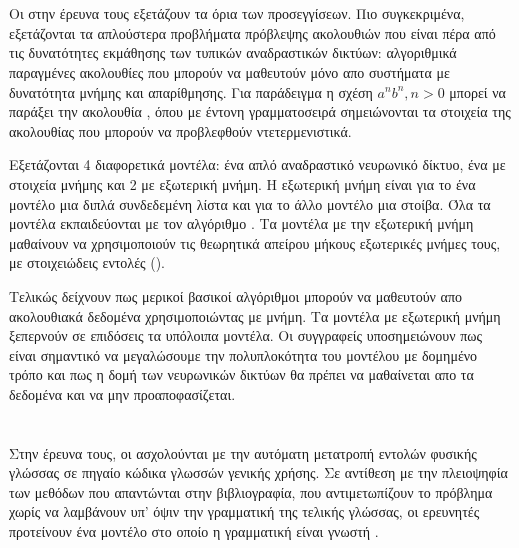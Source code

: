 \section{}

Οι  στην έρευνα τους εξετάζουν τα όρια των  προσεγγίσεων.
Πιο συγκεκριμένα, εξετάζονται τα απλούστερα προβλήματα πρόβλεψης ακολουθιών που είναι πέρα από τις δυνατότητες εκμάθησης των τυπικών αναδραστικών δικτύων: αλγοριθμικά παραγμένες ακολουθίες που μπορούν να μαθευτούν μόνο απο συστήματα με δυνατότητα μνήμης και απαρίθμησης.
Για παράδειγμα η σχέση $a^nb^n, n > 0$ μπορεί να παράξει την ακολουθία , όπου με έντονη γραμματοσειρά σημειώνονται τα στοιχεία της ακολουθίας που μπορούν να προβλεφθούν ντετερμενιστικά.

Εξετάζονται 4 διαφορετικά μοντέλα: ένα απλό αναδραστικό νευρωνικό δίκτυο, ένα  με στοιχεία μνήμης  και 2  με εξωτερική μνήμη.
Η εξωτερική μνήμη είναι για το ένα μοντέλο μια διπλά συνδεδεμένη λίστα και για το άλλο μοντέλο μια στοίβα. Όλα τα μοντέλα εκπαιδεύονται με τον αλγόριθμο .
Τα μοντέλα με την εξωτερική μνήμη μαθαίνουν να χρησιμοποιούν τις θεωρητικά απείρου μήκους εξωτερικές μνήμες τους, με στοιχειώδεις εντολές (). 

Τελικώς δείχνουν πως μερικοί βασικοί αλγόριθμοι μπορούν να μαθευτούν απο ακολουθιακά δεδομένα χρησιμοποιώντας  με μνήμη. Τα μοντέλα με εξωτερική μνήμη ξεπερνούν σε επιδόσεις τα υπόλοιπα μοντέλα. Οι συγγραφείς υποσημειώνουν πως είναι σημαντικό να μεγαλώσουμε την πολυπλοκότητα του μοντέλου με δομημένο τρόπο και πως η δομή των νευρωνικών δικτύων θα πρέπει να μαθαίνεται απο τα δεδομένα και να μην προαποφασίζεται.

\section{}

Στην έρευνα τους, οι  ασχολούνται με την αυτόματη μετατροπή εντολών φυσικής γλώσσας σε πηγαίο κώδικα γλωσσών γενικής χρήσης.
Σε αντίθεση με την πλειοψηφία των μεθόδων που απαντώνται στην βιβλιογραφία, που αντιμετωπίζουν το πρόβλημα χωρίς να λαμβάνουν υπ' όψιν την γραμματική της τελικής γλώσσας, οι ερευνητές προτείνουν ένα μοντέλο στο οποίο η γραμματική είναι γνωστή .

